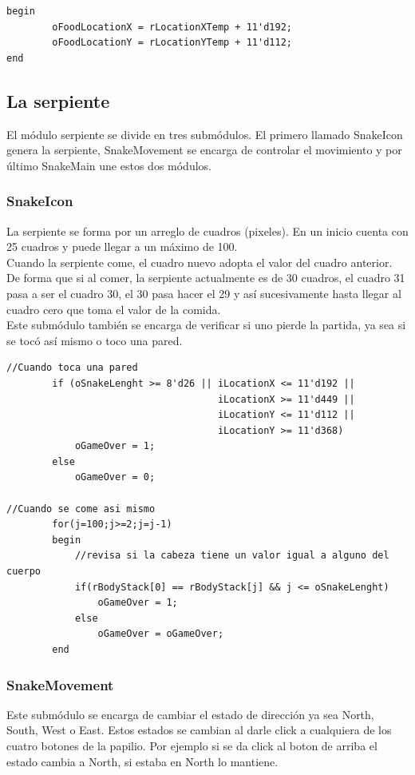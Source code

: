 \documentclass[10pt]{article}
\begin{document}
\begin{lstlisting}
begin
		oFoodLocationX = rLocationXTemp + 11'd192;
		oFoodLocationY = rLocationYTemp + 11'd112;
end
\end{lstlisting}

\subsection{La serpiente}

El módulo serpiente se divide en tres submódulos. El primero llamado SnakeIcon genera la serpiente, SnakeMovement se encarga de controlar el movimiento y por último SnakeMain une estos dos módulos.

\subsubsection{SnakeIcon}

La serpiente se forma por un arreglo de cuadros (pixeles). En un inicio cuenta con 25 cuadros y puede llegar a un máximo de 100.\\

Cuando la serpiente come, el cuadro nuevo adopta el valor del cuadro anterior. De forma que si al comer, la serpiente actualmente es de 30 cuadros, el cuadro 31 pasa a ser el cuadro 30, el 30 pasa hacer el 29 y así sucesivamente hasta llegar al cuadro cero que toma el valor de la comida.\\

Este submódulo también se encarga de verificar si uno pierde la partida, ya sea si se tocó así mismo o toco una pared.

\begin{lstlisting}
//Cuando toca una pared
		if (oSnakeLenght >= 8'd26 || iLocationX <= 11'd192 ||  
		                             iLocationX >= 11'd449 || 
		                             iLocationY <= 11'd112 || 
		                             iLocationY >= 11'd368)
			oGameOver = 1;
		else
			oGameOver = 0;

//Cuando se come asi mismo			
		for(j=100;j>=2;j=j-1) 
		begin
			//revisa si la cabeza tiene un valor igual a alguno del cuerpo 
			if(rBodyStack[0] == rBodyStack[j] && j <= oSnakeLenght)
				oGameOver = 1;
			else
				oGameOver = oGameOver;
		end	
\end{lstlisting}
		 
\subsubsection{SnakeMovement}
Este submódulo se encarga de cambiar el estado de dirección ya sea North, South, West o East. Estos estados se cambian al darle click a cualquiera de los cuatro botones de la papilio. Por ejemplo si se da click al boton de arriba el estado cambia a North, si estaba en North lo mantiene.
\end{document}
